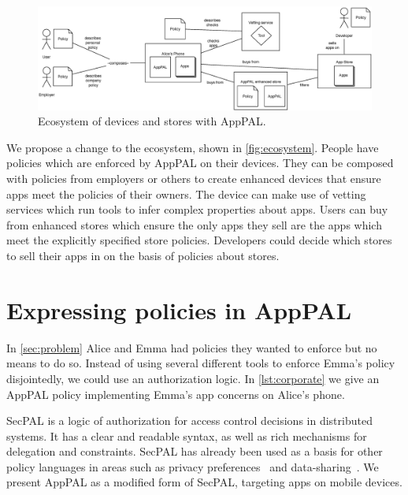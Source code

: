 \documentclass[]{llncs}
\begin{document}
\begin{figure}
\includegraphics{figures/overview.eps}
\caption{Ecosystem of devices and stores with AppPAL.}
\label{fig:ecosystem}
\end{figure}

We propose a change to the ecosystem, shown in \autoref{fig:ecosystem}.
People have policies which are enforced by AppPAL on their devices.
They can be composed with policies from employers or others to create enhanced devices that ensure apps meet the policies of their owners.
The device can make use of vetting services which run tools to infer complex properties about apps.
Users can buy from enhanced stores which ensure the only apps they sell are the apps which meet the explicitly specified store policies.
Developers could decide which stores to sell their apps in on the basis of policies about stores.

\section{Expressing policies in AppPAL}
\label{sec:idea}

In \autoref{sec:problem} Alice and Emma had policies they wanted to enforce but no means to do so.
Instead of using several different tools to enforce Emma's policy disjointedly, we could use an authorization logic.
In \autoref{lst:corporate} we give an AppPAL policy implementing Emma's app concerns on Alice's phone.

SecPAL is a logic of authorization for access control decisions in distributed systems.
It has a clear and readable syntax, as well as rich mechanisms for delegation and constraints.
SecPAL has already been used as a basis for other policy languages in areas such as privacy preferences~\cite{Becker:2009ula} and data-sharing~\cite{Aziz:2011vt}.
We present AppPAL as a modified form of SecPAL, targeting apps on mobile devices.
\end{document}
